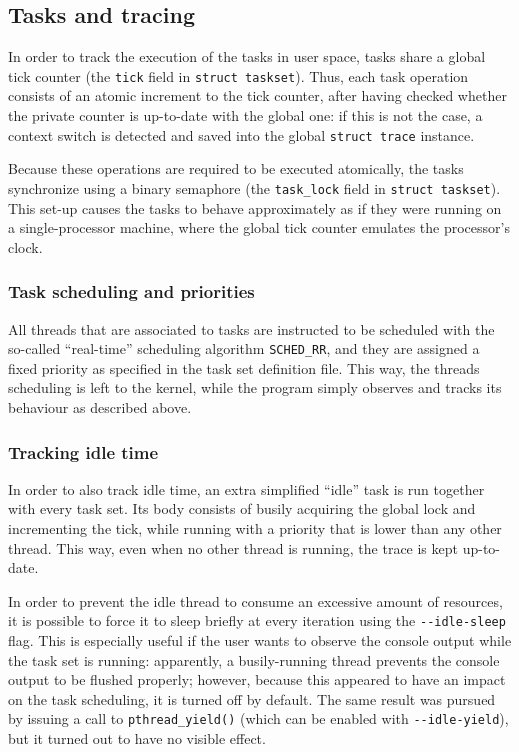 \documentclass[paper=a4, fontsize=11pt]{scrartcl}
\newcommand{\mono}[1]{\texttt{#1}}
\numberwithin{equation}{section}        %
\numberwithin{figure}{section}          %
\numberwithin{table}{section}               %
\numberwithin{fragment}{section}
\begin{document}
\subsection{Tasks and tracing}\label{sec:tasks}
In order to track the execution of the tasks in user space, tasks share a global tick counter (the \mono{tick} field in \mono{struct taskset}).
Thus, each task operation consists of an atomic increment to the tick counter, after having checked whether the private counter is up-to-date with the global one: if this is not the case, a context switch is detected and saved into the global \mono{struct trace} instance.

Because these operations are required to be executed atomically, the tasks synchronize using a binary semaphore (the \mono{task\_lock} field in \mono{struct taskset}).
This set-up causes the tasks to behave approximately as if they were running on a single-processor machine, where the global tick counter emulates the processor's clock.


\subsubsection{Task scheduling and priorities}\label{sec:tasks:prio}
All threads that are associated to tasks are instructed to be scheduled with the so-called ``real-time'' scheduling algorithm \mono{SCHED\_RR}\cite{man-sched}, and they are assigned a fixed priority as specified in the task set definition file. This way, the threads scheduling is left to the kernel, while the program simply observes and tracks its behaviour as described above.


\subsubsection{Tracking idle time}\label{sec:tasks:idle}
In order to also track idle time, an extra simplified ``idle'' task is run together with every task set. Its body consists of busily acquiring the global lock and incrementing the tick, while running with a priority that is lower than any other thread. This way, even when no other thread is running, the trace is kept up-to-date.

In order to prevent the idle thread to consume an excessive amount of resources, it is possible to force it to sleep briefly at every iteration using the \mono{-{}-idle-sleep} flag. This is especially useful if the user wants to observe the console output while the task set is running: apparently, a busily-running thread prevents the console output to be flushed properly; however, because this appeared to have an impact on the task scheduling, it is turned off by default. The same result was pursued by issuing a call to \mono{pthread\_yield()} (which can be enabled with \mono{-{}-idle-yield}), but it turned out to have no visible effect.
\end{document}
